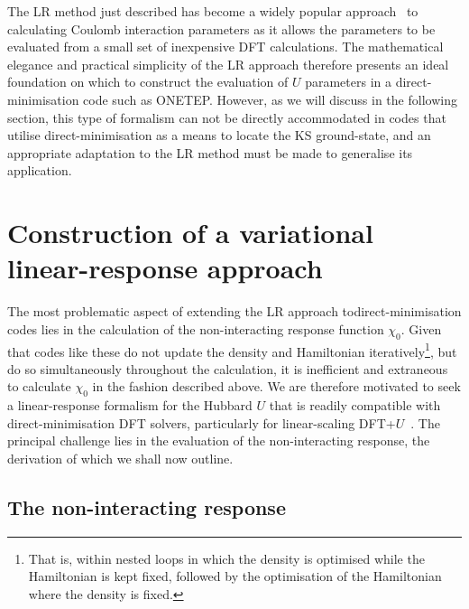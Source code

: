 The LR method just described 
has become a widely popular approach~\cite{QUA:QUA24521,:/content/aip/journal/jcp/133/11/10.1063/1.3489110,0953-8984-22-5-055602,PhysRevB.75.035115,Lee2012,PhysRevLett.106.118501}
to calculating Coulomb interaction parameters 
as it allows the parameters to be 
evaluated from a small set of inexpensive DFT calculations.
%
The mathematical elegance 
and practical simplicity of the LR approach 
therefore presents an ideal foundation 
on which to construct the 
evaluation of $U$ parameters in 
a direct-minimisation code such as {\sc ONETEP}.
%
However, 
as we will discuss in the following section, 
this type of formalism can not be directly accommodated 
in codes that utilise direct-minimisation 
as a means to locate the KS ground-state, 
and an appropriate adaptation 
to the LR method must be made 
to generalise its application.


\section{Construction of a variational linear-response approach}
\label{sec:variational_linear_response}

The most problematic aspect of extending the LR approach 
to\break direct-minimisation codes lies in the calculation of 
the non-interacting response function $\chi_0$.
%
Given that codes like these do not update 
the density and Hamiltonian iteratively\footnote{
That is, within nested loops in which  
the density is optimised while the Hamiltonian is kept fixed, 
followed by the optimisation of the Hamiltonian where the density is fixed.}, 
but do so simultaneously throughout the calculation, 
it is inefficient and extraneous 
to calculate $\chi_0$ 
in the fashion described above.
%
We are therefore motivated to seek 
a linear-response formalism for the 
Hubbard $U$ that is readily compatible with 
direct-minimisation DFT solvers, 
particularly for linear-scaling DFT+$U$~\cite{PhysRevB.85.085107}.
%
The principal challenge lies in the 
evaluation of the non-interacting response, 
the derivation of 
which we shall now outline.

\subsection{The non-interacting response}

